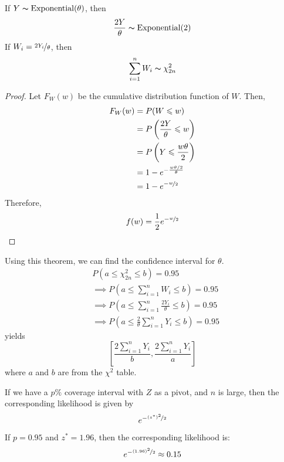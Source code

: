 \begin{thmbox}
    \begin{theorem}
        If $ Y \thicksim \operatorname{Exponential}(\theta) $, then
        \[ \frac{2Y}{\theta} \thicksim \operatorname{Exponential}(2) \]
        If $ W_i=\nicefrac{2Y_i}{\theta} $, then
        \[ \sum\limits_{i=1}^{n} W_i \thicksim \chi^2_{2n} \]
    \end{theorem}
\end{thmbox}
\begin{proof}
    Let $ F_W(w) $ be the cumulative distribution function of $ W $. Then,
    \begin{align*}
        F_W(w)
         & =P(W\leqslant w)                               \\
         & =P\left( \frac{2Y}{\theta} \leqslant w \right) \\
         & =P\left( Y\leqslant \frac{w\theta}{2} \right)  \\
         & =1-e^{-\frac{w\theta/2}{\theta}}               \\
         & =1-e^{-\nicefrac{w}{2}}
    \end{align*}
    Therefore,
    \[ f(w)=\frac{1}{2} e^{-\nicefrac{w}{2}} \]
\end{proof}
Using this theorem, we can find the confidence interval for $ \theta $.
\begin{align*}
     & P\left(a\leqslant \chi^2_{2n}\leqslant b\right)=0.95                                         \\
     & \implies P\left(a \leqslant \sum\limits_{i=1}^{n} W_i \leqslant b\right)=0.95                \\
     & \implies P\left(a\leqslant \sum\limits_{i=1}^{n} \frac{2Y_i}{\theta} \leqslant b\right)=0.95 \\
     & \implies P\left(a\leqslant \frac{2}{\theta} \sum\limits_{i=1}^{n} Y_i\leqslant b\right)=0.95
\end{align*}
yields
\[ \left[ \frac{2 \sum\limits_{i=1}^{n} Y_i}{b} , \frac{2 \sum\limits_{i=1}^{n} Y_i}{a} \right] \]
where $ a $ and $ b $ are from the $ \chi^2 $ table.

\begin{thmbox}
    \begin{theorem}
        If we have a $ p\% $ coverage interval with $ Z $ as a pivot, and $ n $ is large, then
        the corresponding likelihood is given by
        \[ e^{-\nicefrac{(z^*)^2}{2} } \]
    \end{theorem}
\end{thmbox}

\begin{exbox}
    \begin{example}
        If $ p=0.95 $ and $ z^*=1.96 $, then the corresponding likelihood is:
        \[ e^{-\nicefrac{(1.96)^2}{2} }\approx 0.15 \]
    \end{example}
\end{exbox}
